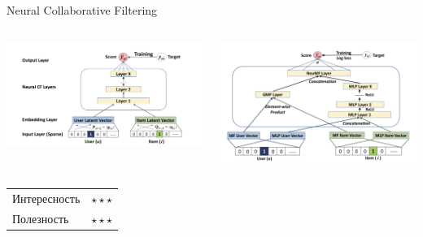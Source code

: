 \documentclass[11pt,aspectratio=169]{beamer}
\begin{document}
\begin{frame}{Neural Collaborative Filtering \cite{NCF}}

\begin{columns}
\begin{column}{0.45\textwidth} 
\begin{center}
\includegraphics[scale=0.35]{images/ncf.png}
\end{center}
\end{column}
\begin{column}{0.45\textwidth}
\begin{center}
\includegraphics[scale=0.35]{images/nfm.png}
\end{center}
\end{column}
\end{columns}

\begin{tabular}{l l}
Интересность & $\star\star\star$ \\
Полезность & $\star\star\star$
\end{tabular}

\end{frame}
\end{document}
